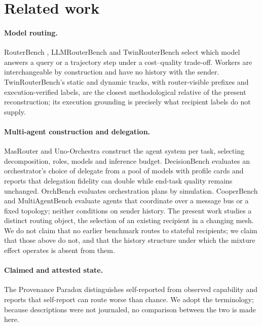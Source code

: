 \documentclass[11pt]{article}
\theoremstyle{definition}
\begin{document}
\section{Related work}

\paragraph{Model routing.}
RouterBench \citep{routerbench2024}, LLMRouterBench \citep{llmrouterbench2026} and TwinRouterBench \citep{twinrouterbench2026} select which model answers a query or a trajectory step under a cost--quality trade-off. Workers are interchangeable by construction and have no history with the sender. TwinRouterBench's static and dynamic tracks, with router-visible prefixes and execution-verified labels, are the closest methodological relative of the present reconstruction; its execution grounding is precisely what recipient labels do not supply.

\paragraph{Multi-agent construction and delegation.}
MasRouter \citep{masrouter2025} and Uno-Orchestra \citep{unoorchestra2026} construct the agent system per task, selecting decomposition, roles, models and inference budget. DecisionBench \citep{decisionbench2026} evaluates an orchestrator's choice of delegate from a pool of models with profile cards and reports that delegation fidelity can double while end-task quality remains unchanged. OrchBench \citep{orchbench2026} evaluates orchestration plans by simulation. CooperBench \citep{cooperbench2026} and MultiAgentBench \citep{marble2025} evaluate agents that coordinate over a message bus or a fixed topology; neither conditions on sender history. The present work studies a distinct routing object, the selection of an existing recipient in a changing mesh. We do not claim that no earlier benchmark routes to stateful recipients; we claim that those above do not, and that the history structure under which the mixture effect operates is absent from them.

\paragraph{Claimed and attested state.}
The Provenance Paradox \citep{provenance2026} distinguishes self-reported from observed capability and reports that self-report can route worse than chance. We adopt the terminology; because descriptions were not journaled, no comparison between the two is made here.
\end{document}
